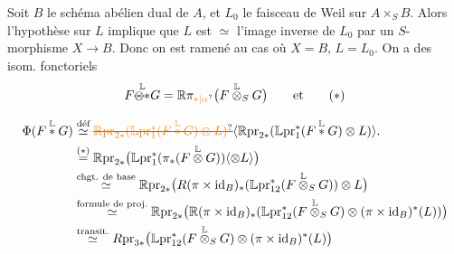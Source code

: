 Soit $B$ le schéma abélien dual de $A$, et $L_0$ le faisceau de Weil sur $A\times_S B$. Alors l'hypothèse sur $L$ implique que $L$ est $\simeq$ l'image inverse de $L_0$ par un $S$-morphisme $X\longrightarrow B$. Donc on est ramené au cas où $X=B$, $L=L_0$.  On a des isom. fonctoriels
\[
F\overset{\mathbb L}{\deleted{\otimes}{*}}G=\mathbb R\pi_{\unsure{*|\alpha}}\bigl(F\overset{\mathbb L}{\otimes}_S G\bigr)\qquad\text{et}\tag*{$(*)$}
\]


\[
\begin{aligned}
\Phi(F\overset{\mathbb L}{*} G)&\overset{\text{déf}}{\simeq}\deleted{\unsure{\mathbb{R} \mathrm{pr}_{2*}(\mathbb{L} \mathrm{pr}_1^*(F\overset{\mathbb L}{*} G)\otimes L)}}\inserted{\mathbb{R} \mathrm{pr}_{2*}(\mathbb{L} \mathrm{pr}_1^*(F\overset{\mathbb L}{*} G)\otimes L)}.\\
&\overset{(*)}{=}\mathbb{R} \mathrm{pr}_{2*}\bigl(\mathbb{L} \mathrm{pr}_1^*(\pi_*(F\overset{\mathbb L}{\otimes} G))\inserted{\otimes L}\bigr)\\
&\overset{\text{chgt. de base}}{\simeq}\mathbb{R} \mathrm{pr}_{2*}\bigl(R(\pi\times \mathrm{id}_B)_*(\mathbb{L} \mathrm{pr}_{12}^*(F\overset{\mathbb L}{\otimes}_S G))\otimes L\bigr)\\
&\overset{\text{formule de proj.}}{\simeq}\mathbb{R} \mathrm{pr}_{2*}\bigl(\mathbb{R}(\pi\times \mathrm{id}_B)_*(\mathbb{L} \mathrm{pr}_{12}^*(F\overset{\mathbb L}{\otimes}_S G)\otimes(\pi\times \mathrm{id}_B)^*(L))\bigr)\\
&\overset{\text{transit.}}{\simeq}R \mathrm{pr}_{3*}\bigl(\mathbb{L} \mathrm{pr}_{12}^*(F\overset{\mathbb L}{\otimes}_S G)\otimes(\pi\times \mathrm{id}_B)^*(L)\bigr)
\end{aligned}
\]

